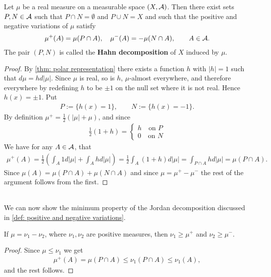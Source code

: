 \begin{theorem}
Let $\mu$ be a real measure on a measurable space $(X, \mathcal{A})$. Then there exist sets $P,N\in \mathcal{A}$ such that $P\cap N=\emptyset$ and $P\cup N = X$ and such that the positive and negative variations of $\mu$ satisfy
\begin{align*}
	\mu^{+}(A)=\mu(P\cap A), \quad \mu^{-}(A)=-\mu(N\cap A), \qquad A\in \mathcal{A}.
\end{align*}
The pair $(P,N)$ is called the \textbf{Hahn decomposition} of $X$ induced by $\mu$.
\end{theorem}
\begin{proof}
By \cref{thm: polar representation} there exists a function $h$ with $|h|=1$ such that $d\mu=hd|\mu|$. Since $\mu$ is real, so is $h$, $\mu$-almost everywhere, and therefore everywhere by redefining $h$ to be $\pm1$ on the null set where it is not real.
Hence $h(x)=\pm 1$. Put
\begin{align*}
	P:=\{h(x)=1\}, \qquad N:=\{h(x)=-1\}.
\end{align*}
By definition $\mu^{+}=\frac{1}{2}(|\mu|+\mu)$, and since
\begin{align*}
	\frac{1}{2}(1+h)=\begin{cases}
	h \quad \text{on } P \\
	0 \quad \text{on } N
	\end{cases}
\end{align*}
We have for any $A\in \mathcal{A}$, that
\begin{align*}
	\mu^{+}(A)=\frac{1}{2}\left( \int_{A}1d|\mu|+\int_{A}hd|\mu| \right)=\frac{1}{2}\int_{A}(1+h)d|\mu|=\int_{P\cap A}hd|\mu|=\mu(P\cap A).
\end{align*}
Since $\mu(A)=\mu(P\cap A)+\mu(N\cap A)$ and since $\mu=\mu^{+}-\mu^{-}$ the rest of the argument follows from the first.
\end{proof}
\text{ } \\
We can now show the minimum property of the Jordan decomposition discussed in \cref{def: positive and negative variations}.

\begin{corollary}\label{cor: Jordan decomp}
If $\mu=\nu_{1}-\nu_{2}$, where $\nu_{1},\nu_{2}$ are positive measures, then $\nu_{1}\ge \mu^{+}$ and $\nu_{2}\ge \mu^{-}$.
\end{corollary}
\begin{proof}
Since $\mu\le \nu_{1}$ we get
\begin{align*}
	\mu^{+}(A)=\mu(P\cap A)\le \nu_{1}(P\cap A)\le \nu_{1}(A),
\end{align*}
and the rest follows.
\end{proof}



